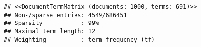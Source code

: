 \documentclass[]{article}
\newenvironment{Shaded}{\begin{snugshade}}{\end{snugshade}}
\newcommand{\CommentTok}[1]{\textcolor[rgb]{0.56,0.35,0.01}{\textit{#1}}}
\newcommand{\KeywordTok}[1]{\textcolor[rgb]{0.13,0.29,0.53}{\textbf{#1}}}
\newcommand{\NormalTok}[1]{#1}
\newcommand{\OperatorTok}[1]{\textcolor[rgb]{0.81,0.36,0.00}{\textbf{#1}}}
\newcommand{\StringTok}[1]{\textcolor[rgb]{0.31,0.60,0.02}{#1}}
\begin{document}
\begin{verbatim}
## <<DocumentTermMatrix (documents: 1000, terms: 691)>>
## Non-/sparse entries: 4549/686451
## Sparsity           : 99%
## Maximal term length: 12
## Weighting          : term frequency (tf)
\end{verbatim}

\begin{Shaded}
\end{Shaded}
\end{document}
